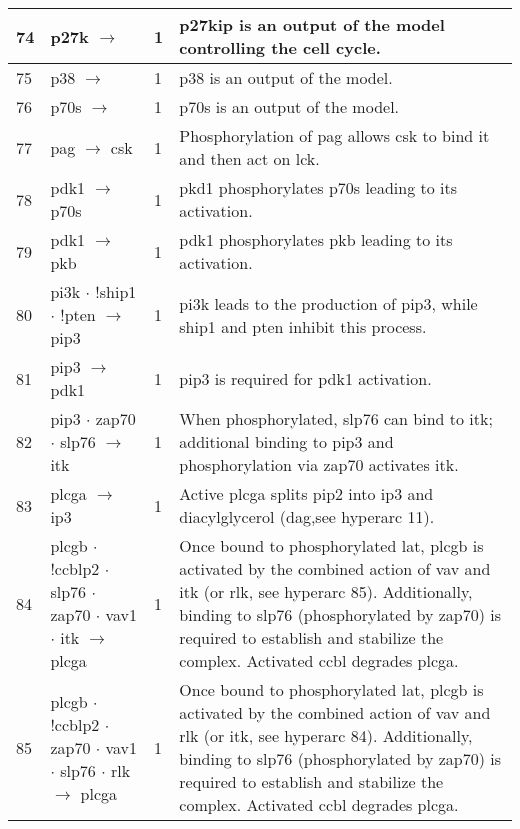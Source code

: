 \documentclass[a4paper, 12pt,epsfig, onecolumn]{article}
\newcommand{\mydot}{\hspace{-0mm} $\cdot$  \hspace{-0mm}}
\begin{document}
{\begin{center}
\begin{longtable}{|p{}|p{}|p{}|p{}|}
74& p27k $\rightarrow$                    &1& p27kip is an output of the model controlling the cell cycle. \\ \hline
75& p38 $\rightarrow$                  &1& p38 is an output of the model. \\ \hline
76& p70s $\rightarrow$         &1& p70s is an output of the model. \\ \hline
77& pag $\rightarrow$ csk        &1& Phosphorylation of pag allows csk to bind it and then act on lck\cite{LindquistJA_ImmRev_03,HorejsiV_NatRevImm_04}.  \\ \hline
78& pdk1 $\rightarrow$ p70s      &1& pkd1 phosphorylates p70s leading to its activation\cite{pullen:1998,hinton:2004}. \\ \hline
79& pdk1 $\rightarrow$ pkb                    &1& pdk1 phosphorylates pkb leading to its activation\cite{LafontV_FEBSletters_00,alessi:1997,anderson:1998}. \\ \hline
80& pi3k\mydot !ship1\mydot !pten $\rightarrow$ pip3    &1& pi3k leads to the production of pip3, while ship1 and pten inhibit this process\cite{okkenhaug:2004,Rameh99}. \\ \hline
81& pip3 $\rightarrow$ pdk1          &1& pip3 is required for pdk1 activation\cite{ mora:2004}. \\ \hline
82& pip3\mydot zap70\mydot slp76 $\rightarrow$ itk    &1& When phosphorylated, slp76 can bind to itk; additional binding to pip3 and phosphorylation via zap70 activates itk\cite{Huang_JBC_04,TogniM_MolImm_04,CzarMJ_BiochemSocTran_01}. \\ \hline
83& plcga $\rightarrow$ ip3                &1& Active plcga splits pip2 into ip3 and diacylglycerol (dag,see hyperarc 11)\cite{Huang_JBC_04,TogniM_MolImm_04}. \\ \hline
84& plcgb\mydot !ccblp2\mydot slp76\mydot zap70\mydot vav1\mydot itk $\rightarrow$ plcga  &1& Once bound to phosphorylated lat, plcgb is activated by the combined action of vav and itk (or rlk, see hyperarc 85)\cite{CzarMJ_BiochemSocTran_01}. Additionally, binding to slp76 (phosphorylated by zap70)  is required to establish and stabilize the complex. Activated ccbl degrades plcga\cite{Rellahan_ECR_03}. \\ \hline
85& plcgb\mydot !ccblp2\mydot zap70\mydot vav1\mydot slp76\mydot rlk        $\rightarrow$ plcga  &1& Once bound to phosphorylated lat,        plcgb is activated by the combined action of vav and rlk (or itk, see hyperarc 84)\cite{CzarMJ_BiochemSocTran_01}. Additionally, binding to slp76 (phosphorylated by zap70)  is required to establish and stabilize the complex. Activated ccbl degrades plcga\cite{Rellahan_ECR_03}. \\ \hline

\end{longtable}
\end{center}}
\end{document}
